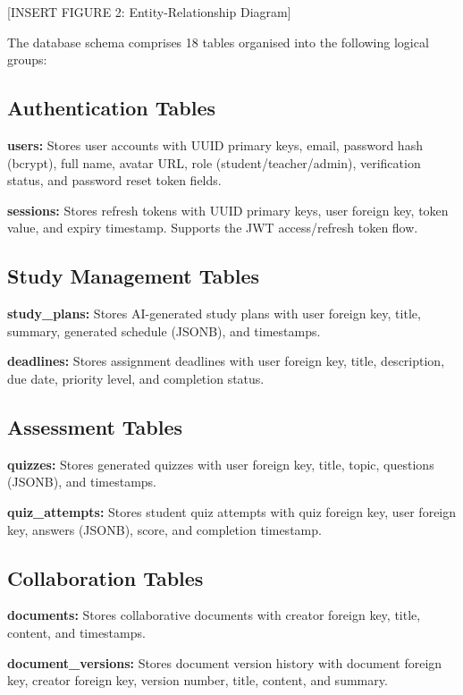 \documentclass[12pt,a4paper]{report}
\begin{document}
[INSERT FIGURE 2: Entity-Relationship Diagram]

The database schema comprises 18 tables organised into the following logical groups:

\subsection{Authentication Tables}

\textbf{users:} Stores user accounts with UUID primary keys, email, password hash (bcrypt), full name, avatar URL, role (student/teacher/admin), verification status, and password reset token fields.

\textbf{sessions:} Stores refresh tokens with UUID primary keys, user foreign key, token value, and expiry timestamp. Supports the JWT access/refresh token flow.

\subsection{Study Management Tables}

\textbf{study\_plans:} Stores AI-generated study plans with user foreign key, title, summary, generated schedule (JSONB), and timestamps.

\textbf{deadlines:} Stores assignment deadlines with user foreign key, title, description, due date, priority level, and completion status.

\subsection{Assessment Tables}

\textbf{quizzes:} Stores generated quizzes with user foreign key, title, topic, questions (JSONB), and timestamps.

\textbf{quiz\_attempts:} Stores student quiz attempts with quiz foreign key, user foreign key, answers (JSONB), score, and completion timestamp.

\subsection{Collaboration Tables}

\textbf{documents:} Stores collaborative documents with creator foreign key, title, content, and timestamps.

\textbf{document\_versions:} Stores document version history with document foreign key, creator foreign key, version number, title, content, and summary.
\end{document}
